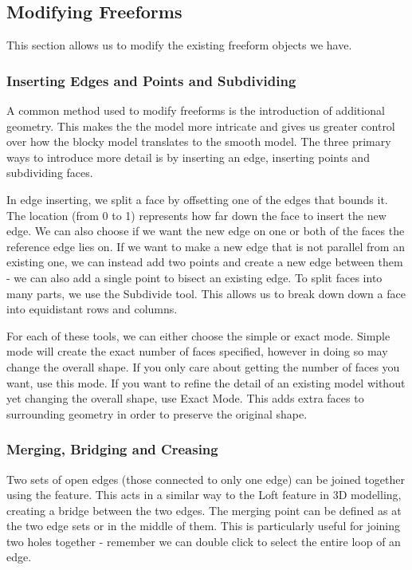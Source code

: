 \subsection{Modifying Freeforms}

This section allows us to modify the existing freeform objects we have.

\subsubsection{Inserting Edges and Points and Subdividing}

A common method used to modify freeforms is the introduction of additional geometry. This makes the the model more intricate and gives us greater control over how the blocky model translates to the smooth model. The three primary ways to introduce more detail is by inserting an edge, inserting points and subdividing faces.

In edge inserting, we split a face by offsetting one of the edges that bounds it. The location (from 0 to 1) represents how far down the face to insert the new edge. We can also choose if we want the new edge on one or both of the faces the reference edge lies on.   If we want to make a new edge that is not parallel from an existing one, we can instead add two points and create a new edge between them - we can also add a single point to bisect an existing edge. To split faces into many parts, we use the Subdivide tool. This allows us to break down down a face into equidistant rows and columns.

For each of these tools, we can either choose the simple or exact mode. Simple mode will create the exact number of faces specified, however in doing so may change the overall shape. If you only care about getting the number of faces you want, use this mode. If you want to refine the detail of an existing model without yet changing the overall shape, use Exact Mode. This adds extra faces to surrounding geometry in order to preserve the original shape.

\subsubsection{Merging, Bridging and Creasing}

Two sets of open edges (those connected to only one edge) can be joined together using the  feature. This acts in a similar way to the Loft feature in 3D modelling, creating a bridge between the two edges. The merging point can be defined as at the two edge sets or in the middle of them. This is particularly useful for joining two holes together - remember we can double click to select the entire loop of an edge.


